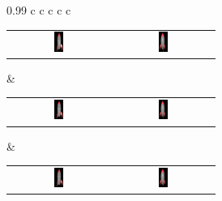 \begin{figure}[!htb]
\begin{tabular*}{0.99\textwidth}{ c c c c c }
        
        \setlength\tabcolsep{0pt}
        \begin{tabular}{cc}
            \includegraphics[width=0.095\textwidth]{figures/results/col_set/rocket0_targ_256px.png} & \includegraphics[width=0.095\textwidth]{figures/results/col_set/rocket4_targ_256px.png}
        \end{tabular}
        &
        \setlength\tabcolsep{0pt}
        \begin{tabular}{cc}
            \includegraphics[width=0.095\textwidth]{figures/results/col_set/rocket0_imnf_150k.png} & \includegraphics[width=0.095\textwidth]{figures/results/col_set/rocket4_imnf_150k.png}
        \end{tabular}
        &
        \setlength\tabcolsep{0pt}
        \begin{tabular}{cc}
            \includegraphics[width=0.095\textwidth]{figures/results/col_set/rocket0_excol_150k.png} & \includegraphics[width=0.095\textwidth]{figures/results/col_set/rocket4_excol_150k.png}

\end{tabular}
\end{tabular*}
\end{figure}
